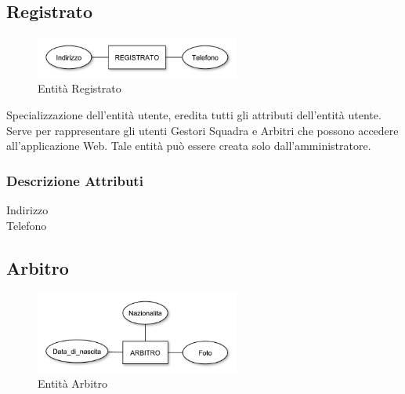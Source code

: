 	\subsection{Registrato}
	
		\begin{figure}[h]
			\centering
			\includegraphics[width=0.6\textwidth]
			{immagini/03-registrato}
			
			\caption{Entità Registrato}
		\end{figure}
		
		Specializzazione dell'entità utente, eredita tutti gli attributi dell'entità utente. Serve per rappresentare gli utenti Gestori Squadra e Arbitri che possono accedere all'applicazione Web. Tale entità può essere creata solo dall'amministratore.
		
		\subsubsection*{Descrizione Attributi}
		
		\begin{description}
			
			\item[Indirizzo]
			
			
			\item[Telefono]
			
			
		\end{description}
	
	\subsection{Arbitro}
		
		\begin{figure}[h]
			\centering
			\includegraphics[width=0.6\textwidth]
			{immagini/04-arbitro}
			
			\caption{Entità Arbitro}
		\end{figure}
		
